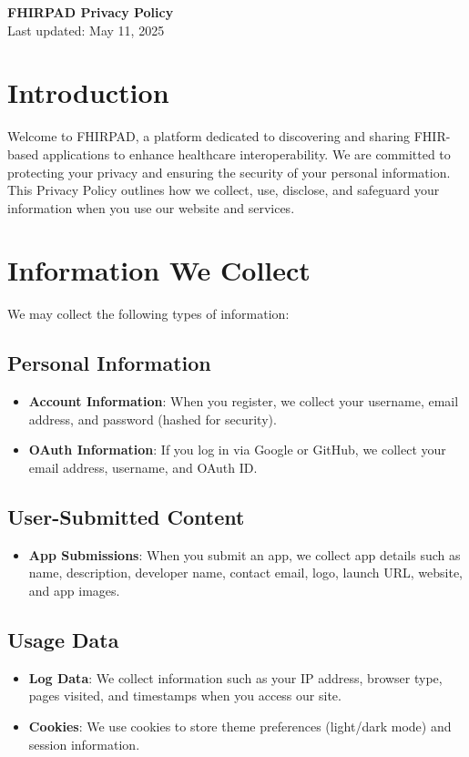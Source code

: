 \documentclass[a4paper,12pt]{article}
\begin{document}
\begin{center}
    {\LARGE\textbf{FHIRPAD Privacy Policy}}\\[0.5cm]
    {\normalsize Last updated: May 11, 2025}
\end{center}

\section{Introduction}
Welcome to FHIRPAD, a platform dedicated to discovering and sharing FHIR-based applications to enhance healthcare interoperability. We are committed to protecting your privacy and ensuring the security of your personal information. This Privacy Policy outlines how we collect, use, disclose, and safeguard your information when you use our website and services.

\section{Information We Collect}
We may collect the following types of information:

\subsection{Personal Information}
\begin{itemize}
    \item \textbf{Account Information}: When you register, we collect your username, email address, and password (hashed for security).
    \item \textbf{OAuth Information}: If you log in via Google or GitHub, we collect your email address, username, and OAuth ID.
\end{itemize}

\subsection{User-Submitted Content}
\begin{itemize}
    \item \textbf{App Submissions}: When you submit an app, we collect app details such as name, description, developer name, contact email, logo, launch URL, website, and app images.
\end{itemize}

\subsection{Usage Data}
\begin{itemize}
    \item \textbf{Log Data}: We collect information such as your IP address, browser type, pages visited, and timestamps when you access our site.
    \item \textbf{Cookies}: We use cookies to store theme preferences (light/dark mode) and session information.
\end{itemize}
\end{document}
